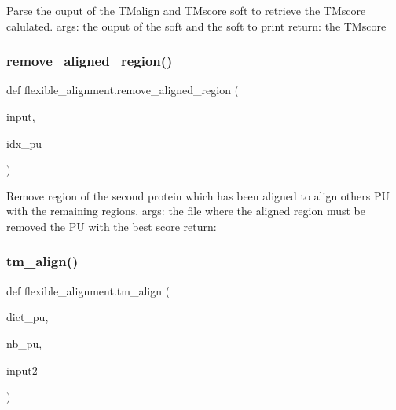 \begin{DoxyVerb}Parse the ouput of the TMalign and TMscore soft to retrieve the
TMscore calulated.
args:
    the ouput of the soft and the soft to print
return:
    the TMscore
\end{DoxyVerb}
 \mbox{\label{namespaceflexible__alignment_a5c513cf8a870212e6bbe35abf93d8f28}} 
\subsubsection{\texorpdfstring{remove\+\_\+aligned\+\_\+region()}{remove\_aligned\_region()}}
{\footnotesize\ttfamily def flexible\+\_\+alignment.\+remove\+\_\+aligned\+\_\+region (\begin{DoxyParamCaption}\item[{}]{input,  }\item[{}]{idx\+\_\+pu }\end{DoxyParamCaption})}

\begin{DoxyVerb}Remove region of the second protein which has been aligned
to align others PU with the remaining regions.
args:
    the file where the aligned region must be removed
    the PU with the best score
return:\end{DoxyVerb}
 \mbox{\label{namespaceflexible__alignment_aaab82e271218bc1d63b3f8edae1977cc}} 
\subsubsection{\texorpdfstring{tm\+\_\+align()}{tm\_align()}}
{\footnotesize\ttfamily def flexible\+\_\+alignment.\+tm\+\_\+align (\begin{DoxyParamCaption}\item[{}]{dict\+\_\+pu,  }\item[{}]{nb\+\_\+pu,  }\item[{}]{input2 }\end{DoxyParamCaption})}

